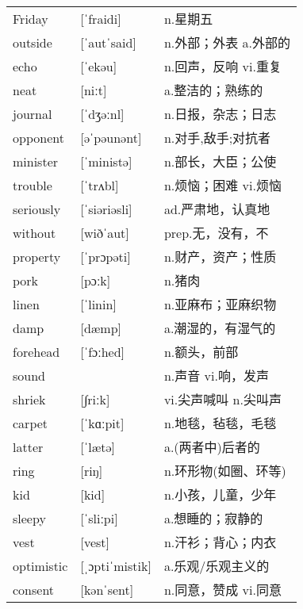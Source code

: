\documentclass[a4paper]{article}
\begin{document}
\section{}
\begin{tabular}{l l l}

Friday & [ˈfraidi] & n.星期五 \\
outside & [ˈautˈsaid] & n.外部；外表 a.外部的 \\
echo & [ˈekəu] & n.回声，反响 vi.重复 \\
neat & [niːt] & a.整洁的；熟练的 \\
journal & [ˈdʒəːnl] & n.日报，杂志；日志 \\
opponent & [əˈpəunənt] & n.对手,敌手;对抗者 \\
minister & [ˈministə] & n.部长，大臣；公使 \\
trouble & [ˈtrʌbl] & n.烦恼；困难 vi.烦恼 \\
seriously & [ˈsiəriəsli] & ad.严肃地，认真地 \\
without & [wiðˈaut] & prep.无，没有，不 \\
property & [ˈprɔpəti] & n.财产，资产；性质 \\
pork & [pɔːk] & n.猪肉 \\
linen & [ˈlinin] & n.亚麻布；亚麻织物 \\
damp & [dæmp] & a.潮湿的，有湿气的 \\
forehead & [ˈfɔːhed] & n.额头，前部 \\
sound &  & n.声音 vi.响，发声 \\
shriek & [∫riːk] & vi.尖声喊叫 n.尖叫声 \\
carpet & [ˈkɑːpit] & n.地毯，毡毯，毛毯 \\
latter & [ˈlætə] & a.(两者中)后者的 \\
ring & [riŋ] & n.环形物(如圈、环等) \\
kid & [kid] & n.小孩，儿童，少年 \\
sleepy & [ˈsliːpi] & a.想睡的；寂静的 \\
vest & [vest] & n.汗衫；背心；内衣 \\
optimistic & [ˌɔptiˈmistik] & a.乐观/乐观主义的 \\
consent & [kənˈsent] & n.同意，赞成 vi.同意 \\

\end{tabular}
\end{document}
